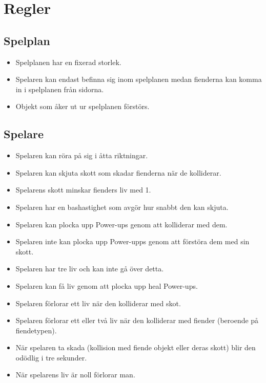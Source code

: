 \documentclass{TDP005mall}
\begin{document}
\section{Regler}
\subsection{Spelplan}
\begin{itemize}
\item Spelplanen har en fixerad storlek.
\item Spelaren kan endast befinna sig inom spelplanen medan fienderna kan komma in i spelplanen från sidorna. 
\item Objekt som åker ut ur spelplanen förstörs.
\end{itemize}

\subsection{Spelare}
\begin{itemize}
\item Spelaren kan röra på sig i åtta riktningar.
\item Spelaren kan skjuta skott som skadar fienderna när de kolliderar.
\item Spelarens skott minskar fienders liv med 1.
\item Spelaren har en bashastighet som avgör hur snabbt den kan skjuta.
\item Spelaren kan plocka upp Power-ups genom att kolliderar med dem.
\item Spelaren inte kan plocka upp Power-upps genom att förstöra dem med sin skott.
\item Spelaren har tre liv och kan inte gå över detta.
\item Spelaren kan få liv genom att plocka upp heal Power-ups.
\item Spelaren förlorar ett liv när den kolliderar med skot.
\item Spelaren förlorar ett eller två liv när den kolliderar med fiender (beroende på fiendetypen).
\item När spelaren ta skada (kollision med fiende objekt eller deras skott) blir den odödlig i tre sekunder.
\item När spelarens liv är noll förlorar man.


\end{itemize}
\end{document}
